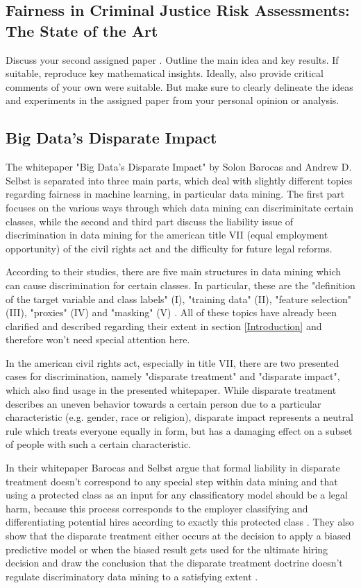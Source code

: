 \documentclass{article}
\begin{document}
\subsection{Fairness in Criminal Justice Risk Assessments: The State of the Art}

Discuss your second assigned paper \cite{Berk.2018}. Outline the main idea and key results. If suitable, reproduce key mathematical insights. Ideally, also provide critical comments of your own were suitable. But make sure to clearly delineate the ideas and experiments in the assigned paper from your personal opinion or analysis.

\subsection{Big Data’s Disparate Impact}
The whitepaper "Big Data’s Disparate Impact" \cite{Barocas.2016} by Solon Barocas and Andrew D. Selbst is separated into three main parts, which deal with slightly different topics regarding fairness in machine learning, in particular data mining. The first part focuses on the various ways through which data mining can discriminitate certain classes, while the second and third part discuss the liability issue of discrimination in data mining for the american title VII (equal employment opportunity) \cite{titleVII} of the civil rights act and the difficulty for future legal reforms.  

According to their studies, there are five main structures in data mining which can cause discrimination for certain classes. In particular, these are the "definition of the target variable and class labels" (I), "training data" (II), "feature selection" (III), "proxies" (IV) and "masking" (V) \cite{Barocas.2016}. All of these topics have already been clarified and described regarding their extent in section \ref{Introduction} and therefore won't need special attention here.

In the american civil rights act, especially in title VII, there are two presented cases for discrimination, namely "disparate treatment" and "disparate impact", which also find usage in the presented whitepaper. While disparate treatment describes an uneven behavior towards a certain person due to a particular characteristic (e.g. gender, race or religion), disparate impact represents a neutral rule which treats everyone equally in form, but has a damaging effect on a subset of people with such a certain characteristic.

In their whitepaper Barocas and Selbst argue that formal liability in disparate treatment doesn't correspond to any special step within data mining and that using a protected class as an input for any classificatory model should be a legal harm, because this process corresponds to the employer classifying and differentiating potential hires according to exactly this protected class \cite{Barocas.2016}. They also show that the disparate treatment either occurs at the decision to apply  a biased predictive model or when the biased result gets used for the ultimate hiring decision and draw the conclusion that the disparate treatment doctrine doesn't regulate discriminatory data mining to a satisfying extent \cite{Barocas.2016}. 
\end{document}
